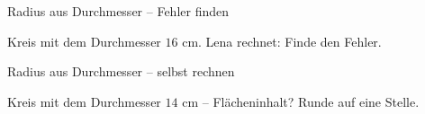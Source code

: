 \begin{aufgabe}{Radius aus Durchmesser – Fehler finden}
\begin{teile}
\teil Kreis mit dem Durchmesser $16$ cm. Lena rechnet:  Finde den Fehler.
\end{teile}
\end{aufgabe}

\begin{aufgabe}{Radius aus Durchmesser – selbst rechnen}
\begin{teile}
\teil Kreis mit dem Durchmesser $14$ cm – Flächeninhalt? Runde auf eine Stelle. \leerfeld[cm²]
\end{teile}
\end{aufgabe}
